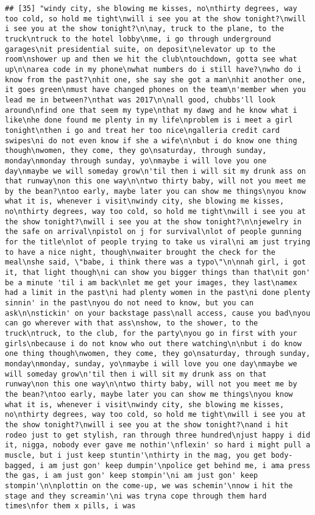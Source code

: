 \documentclass[]{article}
\begin{document}
\begin{verbatim}
## [35] "windy city, she blowing me kisses, no\nthirty degrees, way too cold, so hold me tight\nwill i see you at the show tonight?\nwill i see you at the show tonight?\n\nay, truck to the plane, to the truck\ntruck to the hotel lobby\nme, i go through underground garages\nit presidential suite, on deposit\nelevator up to the room\nshower up and then we hit the club\ntouchdown, gotta see what up\n\narea code in my phone\nwhat numbers do i still have?\nwho do i know from the past?\nhit one, she say she got a man\nhit another one, it goes green\nmust have changed phones on the team\n'member when you lead me in between?\nthat was 2017\n\nall good, chubbs'll look around\nfind one that seem my type\nthat my dawg and he know what i like\nhe done found me plenty in my life\nproblem is i meet a girl tonight\nthen i go and treat her too nice\ngalleria credit card swipes\ni do not even know if she a wife\n\nbut i do know one thing though\nwomen, they come, they go\nsaturday, through sunday, monday\nmonday through sunday, yo\nmaybe i will love you one day\nmaybe we will someday grow\n'til then i will sit my drunk ass on that runway\non this one way\n\ntwo thirty baby, will not you meet me by the bean?\ntoo early, maybe later you can show me things\nyou know what it is, whenever i visit\nwindy city, she blowing me kisses, no\nthirty degrees, way too cold, so hold me tight\nwill i see you at the show tonight?\nwill i see you at the show tonight?\n\njewelry in the safe on arrival\npistol on j for survival\nlot of people gunning for the title\nlot of people trying to take us viral\ni am just trying to have a nice night, though\nwaiter brought the check for the meal\nshe said, \"babe, i think there was a typo\"\n\nnah girl, i got it, that light though\ni can show you bigger things than that\nit gon' be a minute 'til i am back\nlet me get your images, they last\namex had a limit in the past\ni had plenty women in the past\ni done plenty sinnin' in the past\nyou do not need to know, but you can ask\n\nstickin' on your backstage pass\nall access, cause you bad\nyou can go wherever with that ass\nshow, to the shower, to the truck\ntruck, to the club, for the party\nyou go in first with your girls\nbecause i do not know who out there watching\n\nbut i do know one thing though\nwomen, they come, they go\nsaturday, through sunday, monday\nmonday, sunday, yo\nmaybe i will love you one day\nmaybe we will someday grow\n'til then i will sit my drunk ass on that runway\non this one way\n\ntwo thirty baby, will not you meet me by the bean?\ntoo early, maybe later you can show me things\nyou know what it is, whenever i visit\nwindy city, she blowing me kisses, no\nthirty degrees, way too cold, so hold me tight\nwill i see you at the show tonight?\nwill i see you at the show tonight?\nand i hit rodeo just to get stylish, ran through three hundred\njust happy i did it, nigga, nobody ever gave me nothin'\nflexin' so hard i might pull a muscle, but i just keep stuntin'\nthirty in the mag, you get body-bagged, i am just gon' keep dumpin'\npolice get behind me, i ama press the gas, i am just gon' keep stompin'\ni am just gon' keep stompin'\n\nplottin on the come-up, we was schemin'\nnow i hit the stage and they screamin'\ni was tryna cope through them hard times\nfor them x pills, i was 
\end{verbatim}
\end{document}

